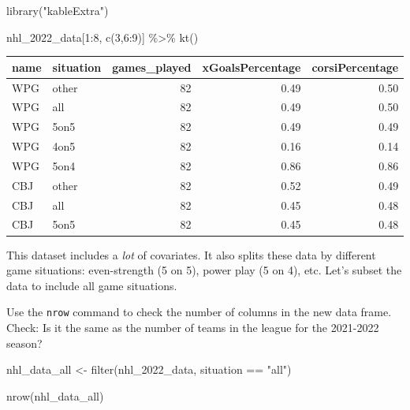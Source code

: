 \documentclass[
  11pt,
]{book}
\newenvironment{Shaded}{\begin{snugshade}}{\end{snugshade}}
\newcommand{\DecValTok}[1]{\textcolor[rgb]{0.00,0.00,0.81}{#1}}
\newcommand{\FunctionTok}[1]{\textcolor[rgb]{0.00,0.00,0.00}{#1}}
\newcommand{\NormalTok}[1]{#1}
\newcommand{\OtherTok}[1]{\textcolor[rgb]{0.56,0.35,0.01}{#1}}
\newcommand{\SpecialCharTok}[1]{\textcolor[rgb]{0.00,0.00,0.00}{#1}}
\newcommand{\StringTok}[1]{\textcolor[rgb]{0.31,0.60,0.02}{#1}}
\theoremstyle{definition}
\theoremstyle{definition}
\theoremstyle{definition}
\theoremstyle{definition}
\theoremstyle{remark}
\begin{document}
\begin{Shaded}
\begin{Highlighting}[]
\FunctionTok{library}\NormalTok{(}\StringTok{"kableExtra"}\NormalTok{)}

\NormalTok{nhl\_2022\_data[}\DecValTok{1}\SpecialCharTok{:}\DecValTok{8}\NormalTok{, }\FunctionTok{c}\NormalTok{(}\DecValTok{3}\NormalTok{,}\DecValTok{6}\SpecialCharTok{:}\DecValTok{9}\NormalTok{)] }\SpecialCharTok{\%\textgreater{}\%} \FunctionTok{kt}\NormalTok{()}
\end{Highlighting}
\end{Shaded}

\begin{table}[H]
\centering
\begin{tabular}{llrrr}
\toprule
name & situation & games\_played & xGoalsPercentage & corsiPercentage\\
\midrule
WPG & other & 82 & 0.49 & 0.50\\
WPG & all & 82 & 0.49 & 0.50\\
WPG & 5on5 & 82 & 0.49 & 0.49\\
WPG & 4on5 & 82 & 0.16 & 0.14\\
WPG & 5on4 & 82 & 0.86 & 0.86\\
CBJ & other & 82 & 0.52 & 0.49\\
CBJ & all & 82 & 0.45 & 0.48\\
CBJ & 5on5 & 82 & 0.45 & 0.48\\
\bottomrule
\end{tabular}
\end{table}

This dataset includes a \emph{lot} of covariates. It also splits these data by different game situations: even-strength (5 on 5), power play (5 on 4), etc. Let's subset the data to include all game situations.

Use the \texttt{nrow} command to check the number of columns in the new data frame. Check: Is it the same as the number of teams in the league for the 2021-2022 season?

\begin{Shaded}
\begin{Highlighting}[]
\NormalTok{nhl\_data\_all }\OtherTok{\textless{}{-}} \FunctionTok{filter}\NormalTok{(nhl\_2022\_data, situation }\SpecialCharTok{==} \StringTok{"all"}\NormalTok{)}

\FunctionTok{nrow}\NormalTok{(nhl\_data\_all)}
\end{Highlighting}
\end{Shaded}
\end{document}
